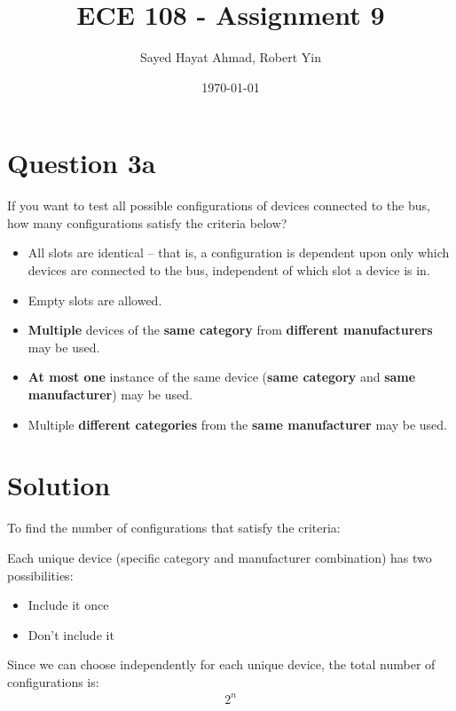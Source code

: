 \documentclass{article}
\title{ECE 108 - Assignment 9}
\author{Sayed Hayat Ahmad, Robert Yin}
\date{\today}
\begin{document}
\maketitle

\section*{Question 3a}

If you want to test all possible configurations of devices connected to the bus, how many configurations satisfy the criteria below?

\begin{itemize}
    \item All slots are identical -- that is, a configuration is dependent upon only which devices are connected to the bus, independent of which slot a device is in.
    \item Empty slots are allowed.
\end{itemize}

\begin{itemize}
    \item \textbf{Multiple} devices of the \textbf{same category} from \textbf{different manufacturers} may be used.
    \item \textbf{At most one} instance of the same device (\textbf{same category} and \textbf{same manufacturer}) may be used.
    \item Multiple \textbf{different categories} from the \textbf{same manufacturer} may be used.
\end{itemize}

\section*{Solution}

To find the number of configurations that satisfy the criteria:

Each unique device (specific category and manufacturer combination) has two possibilities:
\begin{itemize}
    \item Include it once
    \item Don't include it
\end{itemize}

Since we can choose independently for each unique device, the total number of configurations is:
\begin{align}
    2^n
\end{align}
\end{document}
